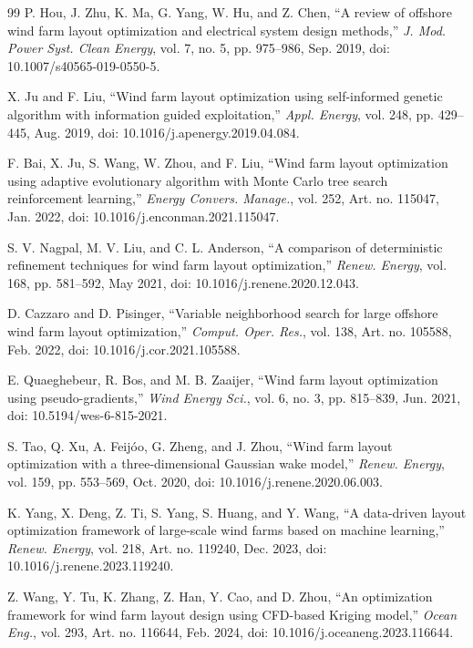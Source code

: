 \begin{thebibliography}{99}
P. Hou, J. Zhu, K. Ma, G. Yang, W. Hu, and Z. Chen, ``A review of offshore wind farm layout optimization and electrical system design methods,'' \textit{J. Mod. Power Syst. Clean Energy}, vol. 7, no. 5, pp. 975--986, Sep. 2019, doi: 10.1007/s40565-019-0550-5.

X. Ju and F. Liu, ``Wind farm layout optimization using self-informed genetic algorithm with information guided exploitation,'' \textit{Appl. Energy}, vol. 248, pp. 429--445, Aug. 2019, doi: 10.1016/j.apenergy.2019.04.084.

F. Bai, X. Ju, S. Wang, W. Zhou, and F. Liu, ``Wind farm layout optimization using adaptive evolutionary algorithm with Monte Carlo tree search reinforcement learning,'' \textit{Energy Convers. Manage.}, vol. 252, Art. no. 115047, Jan. 2022, doi: 10.1016/j.enconman.2021.115047.

S. V. Nagpal, M. V. Liu, and C. L. Anderson, ``A comparison of deterministic refinement techniques for wind farm layout optimization,'' \textit{Renew. Energy}, vol. 168, pp. 581--592, May 2021, doi: 10.1016/j.renene.2020.12.043.

D. Cazzaro and D. Pisinger, ``Variable neighborhood search for large offshore wind farm layout optimization,'' \textit{Comput. Oper. Res.}, vol. 138, Art. no. 105588, Feb. 2022, doi: 10.1016/j.cor.2021.105588.

E. Quaeghebeur, R. Bos, and M. B. Zaaijer, ``Wind farm layout optimization using pseudo-gradients,'' \textit{Wind Energy Sci.}, vol. 6, no. 3, pp. 815--839, Jun. 2021, doi: 10.5194/wes-6-815-2021.

S. Tao, Q. Xu, A. Feij\'oo, G. Zheng, and J. Zhou, ``Wind farm layout optimization with a three-dimensional Gaussian wake model,'' \textit{Renew. Energy}, vol. 159, pp. 553--569, Oct. 2020, doi: 10.1016/j.renene.2020.06.003.

K. Yang, X. Deng, Z. Ti, S. Yang, S. Huang, and Y. Wang, ``A data-driven layout optimization framework of large-scale wind farms based on machine learning,'' \textit{Renew. Energy}, vol. 218, Art. no. 119240, Dec. 2023, doi: 10.1016/j.renene.2023.119240.

Z. Wang, Y. Tu, K. Zhang, Z. Han, Y. Cao, and D. Zhou, ``An optimization framework for wind farm layout design using CFD-based Kriging model,'' \textit{Ocean Eng.}, vol. 293, Art. no. 116644, Feb. 2024, doi: 10.1016/j.oceaneng.2023.116644.


\end{thebibliography}
